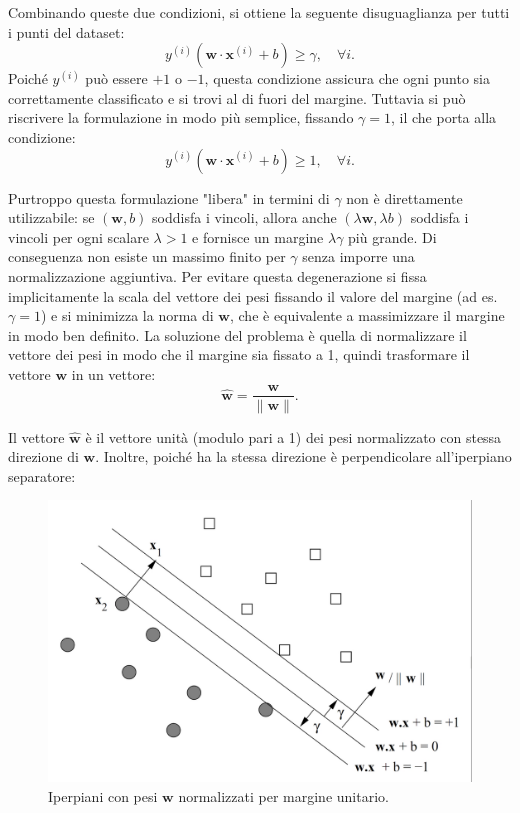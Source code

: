 Combinando queste due condizioni, si ottiene la seguente disuguaglianza per tutti i punti del dataset:
\[
y^{(i)}(\mathbf{w} \cdot \mathbf{x}^{(i)} + b) \geq \gamma, \quad \forall i.
\]
Poiché $y^{(i)}$ può essere $+1$ o $-1$, questa condizione assicura che ogni punto sia correttamente classificato e si trovi al di fuori del margine. Tuttavia si può riscrivere la formulazione in modo più semplice, fissando \(\gamma = 1\), il che porta alla condizione:
\[
y^{(i)}(\mathbf{w} \cdot \mathbf{x}^{(i)} + b) \geq 1, \quad \forall i.
\]

Purtroppo questa formulazione "libera" in termini di $\gamma$ non è direttamente utilizzabile: se $(\mathbf{w},b)$ soddisfa i vincoli, allora anche $(\lambda\mathbf{w},\lambda b)$ soddisfa i vincoli per ogni scalare $\lambda>1$ e fornisce un margine $\lambda\gamma$ più grande. Di conseguenza non esiste un massimo finito per $\gamma$ senza imporre una normalizzazione aggiuntiva. Per evitare questa degenerazione si fissa implicitamente la scala del vettore dei pesi fissando il valore del margine (ad es. $\gamma=1$) e si minimizza la norma di $\mathbf{w}$, che è equivalente a massimizzare il margine in modo ben definito. La soluzione del problema è quella di normalizzare il vettore dei pesi in modo che il margine sia fissato a 1, quindi trasformare il vettore $\mathbf{w}$ in un vettore:
\[
\hat{\mathbf{w}} = \frac{\mathbf{w}}{\|\mathbf{w}\|}.
\]

Il vettore $\hat{\mathbf{w}}$ è il vettore unità (modulo pari a 1) dei pesi normalizzato con stessa direzione di $\mathbf{w}$. Inoltre, poiché ha la stessa direzione è perpendicolare all'iperpiano separatore:

\begin{figure}[htbp]
  \centering
  \includegraphics[width=.8\textwidth]{images/normalized_hyperplane_svm.png}
  \caption{Iperpiani con pesi $\mathbf{w}$ normalizzati per margine unitario.}
  \label{fig:svm-margin-normalized}
\end{figure}

